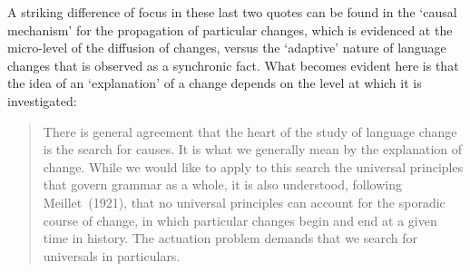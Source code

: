 
A striking difference of focus in these last two quotes can be found in the `causal mechanism' for the propagation of particular changes, which is evidenced at the micro-level of the diffusion of changes, versus the `adaptive' nature of language changes that is observed as a synchronic fact.
What becomes evident here is that the idea of an `explanation' of a change depends on the level at which it is investigated:

\begin{quote}
There is general agreement that the heart of the study of language change is the search for causes. It is what we generally mean by the explanation of change. While we would like to apply to this search the universal principles that govern grammar as a whole, it is also understood, following Meillet~(1921), that no universal principles can account for the sporadic course of change, in which particular changes begin and end at a given time in history. The actuation problem demands that we search for universals in particulars.~\citep[p.90]{Labov2010}
\end{quote}

